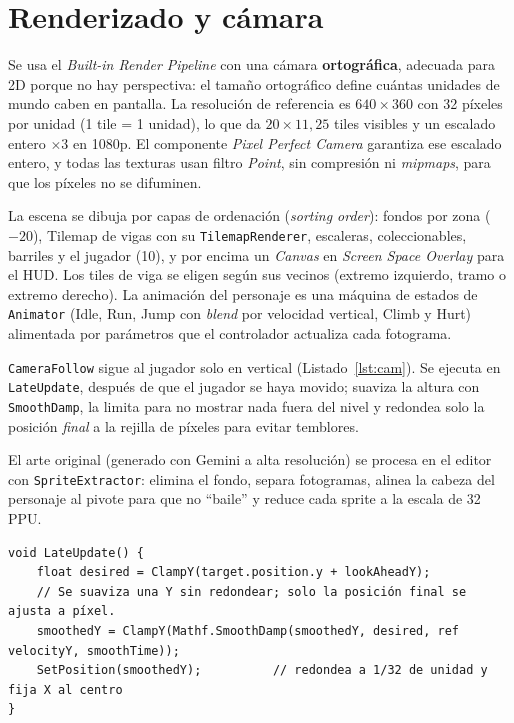 \documentclass[runningheads]{llncs}
\begin{document}
\section{Renderizado y cámara}
Se usa el \emph{Built-in Render Pipeline} con una cámara \textbf{ortográfica}, adecuada para 2D porque
no hay perspectiva: el tamaño ortográfico define cuántas unidades de mundo caben en pantalla. La
resolución de referencia es $640\times360$ con 32 píxeles por unidad (1 tile = 1 unidad), lo que da
$20\times11{,}25$ tiles visibles y un escalado entero $\times3$ en 1080p. El componente
\emph{Pixel Perfect Camera} garantiza ese escalado entero, y todas las texturas usan filtro
\emph{Point}, sin compresión ni \emph{mipmaps}, para que los píxeles no se difuminen.

La escena se dibuja por capas de ordenación (\emph{sorting order}): fondos por zona ($-20$), Tilemap de
vigas con su \texttt{TilemapRenderer}, escaleras, coleccionables, barriles y el jugador (10), y por
encima un \emph{Canvas} en \emph{Screen Space Overlay} para el HUD. Los tiles de viga se eligen
según sus vecinos (extremo izquierdo, tramo o extremo derecho). La animación del personaje es una
máquina de estados de \texttt{Animator} (Idle, Run, Jump con \emph{blend} por velocidad vertical,
Climb y Hurt) alimentada por parámetros que el controlador actualiza cada fotograma.

\texttt{CameraFollow} sigue al jugador solo en vertical (Listado~\ref{lst:cam}). Se ejecuta en
\texttt{LateUpdate}, después de que el jugador se haya movido; suaviza la altura con
\texttt{SmoothDamp}, la limita para no mostrar nada fuera del nivel y redondea solo la posición
\emph{final} a la rejilla de píxeles para evitar temblores.

El arte original (generado con Gemini a alta resolución) se procesa en el editor con \texttt{SpriteExtractor}:
elimina el fondo, separa fotogramas, alinea la cabeza del personaje al pivote para que no ``baile'' y
reduce cada sprite a la escala de 32\,PPU.

\par\noindent\begin{minipage}{\linewidth}
\begin{lstlisting}[caption={Actualización de la cámara (\texttt{CameraFollow.cs}).},label=lst:cam]
void LateUpdate() {
    float desired = ClampY(target.position.y + lookAheadY);
    // Se suaviza una Y sin redondear; solo la posición final se ajusta a píxel.
    smoothedY = ClampY(Mathf.SmoothDamp(smoothedY, desired, ref velocityY, smoothTime));
    SetPosition(smoothedY);          // redondea a 1/32 de unidad y fija X al centro
}
\end{lstlisting}
\end{minipage}\par
\end{document}
